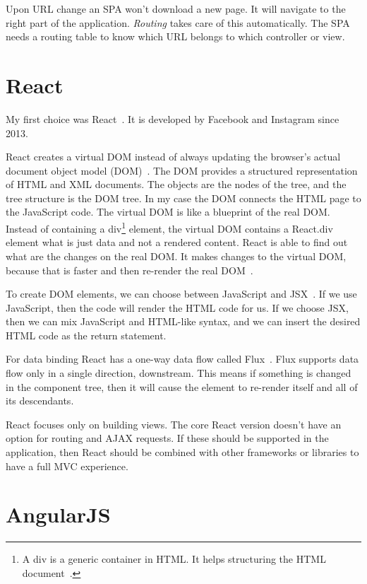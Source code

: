 Upon URL change an SPA won't download a new page. It will navigate to the right part of the application. \emph{Routing} takes care of this automatically. The SPA needs a routing table to know which URL belongs to which controller or view.

\section{React}

My first choice was React~\cite{React}. It is developed by Facebook and Instagram since 2013.

React creates a virtual DOM instead of always updating the browser's actual document object model (DOM)~\cite{dom}. The DOM provides a structured representation of HTML and XML documents. The objects are the nodes of the tree, and the tree structure is the DOM tree. In my case the DOM connects the HTML page to the JavaScript code. The virtual DOM is like a blueprint of the real DOM. Instead of containing a div\footnote{A div is a generic container in HTML. It helps structuring the HTML document~\cite{div}.} element, the virtual DOM contains a React.div element what is just data and not a rendered content. React is able to find out what are the changes on the real DOM. It makes changes to the virtual DOM, because that is faster and then re-render the real DOM~\cite{React-Virtual-DOM}.

To create DOM elements, we can choose between JavaScript and JSX~\cite{JSX}. If we use JavaScript, then the code will render the HTML code for us. If we choose JSX, then we can mix JavaScript and HTML-like syntax, and we can insert the desired HTML code as the return statement. 

For data binding React has a one-way data flow called Flux~\cite{Flux}. Flux supports data flow only in a single direction, downstream. This means if something is changed in the component tree, then it will cause the element to re-render itself and all of its descendants.

React focuses only on building views. The core React version doesn't have an option for routing and AJAX requests. If these should be supported in the application, then React should be combined with other frameworks or libraries to have a full MVC experience.

\section{AngularJS}

